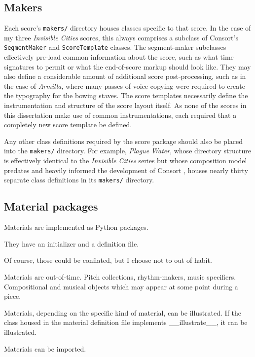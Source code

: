 \subsection{Makers}
\label{ssec:makers}

Each score's \texttt{makers/} directory houses classes specific to that score.
In the case of my three \emph{Invisible Cities} scores, this always comprises a
subclass of Consort's \texttt{SegmentMaker} and \texttt{ScoreTemplate} classes.
The segment-maker subclasses effectively pre-load common information about the
score, such as what time signatures to permit or what the end-of-score markup
should look like. They may also define a considerable amount of additional
score post-processing, such as in the case of \emph{Armilla}, where many passes
of voice copying were required to create the typography for the bowing staves.
The score templates necessarily define the instrumentation and structure of the
score layout itself. As none of the scores in this dissertation make use of
common instrumentations, each required that a completely new score template be
defined.

Any other class definitions required by the score package should also be placed
into the \texttt{makers/} directory. For example, \emph{Plague Water}, whose
directory structure is effectively identical to the \emph{Invisible Cities}
series but whose composition model predates and heavily informed the
development of Consort , houses nearly thirty separate class definitions in its
\texttt{makers/} directory.

\subsection{Material packages}
\label{ssec:material-packages}

Materials are implemented as Python packages.

They have an initializer and a
definition file.

Of course, those could be conflated, but I choose not to out
of habit.


Materials are out-of-time. Pitch collections, rhythm-makers, music specifiers.
Compositional and musical objects which may appear at some point during a
piece.

Materials, depending on the specific kind of material, can be illustrated. If
the class housed in the material definition file implements \_\_illustrate\_\_,
it can be illustrated.

Materials can be imported.


